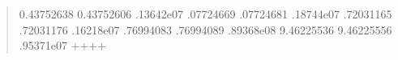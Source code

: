 \documentclass[letterpaper,10pt,english]{sphinxmanual}
\begin{document}
\begin{enumerate}
\begin{quote}
\begin{sphinxVerbatim}[commandchars=\\\{\}]
    \PYGZhy{}0.43752638          \PYGZhy{}0.43752606  .13642e\PYGZhy{}07 
     .07724669           .07724681  .18744e\PYGZhy{}07 
     .72031165           .72031176  .16218e\PYGZhy{}07 
     .76994083           .76994089  .89368e\PYGZhy{}08 
    \PYGZhy{}9.46225536          \PYGZhy{}9.46225556  .95371e\PYGZhy{}07 
+\PYGZhy{}\PYGZhy{}\PYGZhy{}\PYGZhy{}\PYGZhy{}\PYGZhy{}\PYGZhy{}\PYGZhy{}\PYGZhy{}\PYGZhy{}\PYGZhy{}\PYGZhy{}\PYGZhy{}\PYGZhy{}\PYGZhy{}\PYGZhy{}+\PYGZhy{}\PYGZhy{}\PYGZhy{}\PYGZhy{}\PYGZhy{}\PYGZhy{}\PYGZhy{}\PYGZhy{}\PYGZhy{}\PYGZhy{}\PYGZhy{}\PYGZhy{}\PYGZhy{}\PYGZhy{}\PYGZhy{}\PYGZhy{}\PYGZhy{}\PYGZhy{}\PYGZhy{}\PYGZhy{}\PYGZhy{}+\PYGZhy{}\PYGZhy{}\PYGZhy{}\PYGZhy{}\PYGZhy{}\PYGZhy{}\PYGZhy{}\PYGZhy{}\PYGZhy{}\PYGZhy{}\PYGZhy{}\PYGZhy{}\PYGZhy{}+


\end{sphinxVerbatim}
\end{quote}
\end{enumerate}
\end{document}
